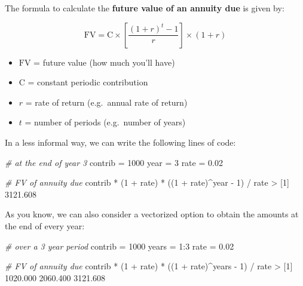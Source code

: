 \documentclass[
]{book}
\newenvironment{Shaded}{\begin{snugshade}}{\end{snugshade}}
\newcommand{\CommentTok}[1]{\textcolor[rgb]{0.56,0.35,0.01}{\textit{#1}}}
\newcommand{\DecValTok}[1]{\textcolor[rgb]{0.00,0.00,0.81}{#1}}
\newcommand{\FloatTok}[1]{\textcolor[rgb]{0.00,0.00,0.81}{#1}}
\newcommand{\NormalTok}[1]{#1}
\newcommand{\OtherTok}[1]{\textcolor[rgb]{0.56,0.35,0.01}{#1}}
\newcommand{\SpecialCharTok}[1]{\textcolor[rgb]{0.00,0.00,0.00}{#1}}
\begin{document}
The formula to calculate the \textbf{future value of an annuity due} is given by:

\[
\text{FV} = \text{C} \times \left [ \frac{(1 + r)^t - 1}{r} \right] \times (1 + r)
\]

\begin{itemize}
\item
  \(\text{FV}\) = future value (how much you'll have)
\item
  \(\text{C}\) = constant periodic contribution
\item
  \(r\) = rate of return (e.g.~annual rate of return)
\item
  \(t\) = number of periods (e.g.~number of years)
\end{itemize}

In a less informal way, we can write the following lines of code:

\begin{Shaded}
\begin{Highlighting}[]
\CommentTok{\# at the end of year 3}
\NormalTok{contrib }\OtherTok{=} \DecValTok{1000}
\NormalTok{year }\OtherTok{=} \DecValTok{3}
\NormalTok{rate }\OtherTok{=} \FloatTok{0.02}

\CommentTok{\# FV of annuity due}
\NormalTok{contrib }\SpecialCharTok{*}\NormalTok{ (}\DecValTok{1} \SpecialCharTok{+}\NormalTok{ rate) }\SpecialCharTok{*}\NormalTok{ ((}\DecValTok{1} \SpecialCharTok{+}\NormalTok{ rate)}\SpecialCharTok{\^{}}\NormalTok{year }\SpecialCharTok{{-}} \DecValTok{1}\NormalTok{) }\SpecialCharTok{/}\NormalTok{ rate}
\SpecialCharTok{\textgreater{}}\NormalTok{ [}\DecValTok{1}\NormalTok{] }\FloatTok{3121.608}
\end{Highlighting}
\end{Shaded}

As you know, we can also consider a vectorized option to obtain the
amounts at the end of every year:

\begin{Shaded}
\begin{Highlighting}[]
\CommentTok{\# over a 3 year period}
\NormalTok{contrib }\OtherTok{=} \DecValTok{1000}
\NormalTok{years }\OtherTok{=} \DecValTok{1}\SpecialCharTok{:}\DecValTok{3}
\NormalTok{rate }\OtherTok{=} \FloatTok{0.02}

\CommentTok{\# FV of annuity due}
\NormalTok{contrib }\SpecialCharTok{*}\NormalTok{ (}\DecValTok{1} \SpecialCharTok{+}\NormalTok{ rate) }\SpecialCharTok{*}\NormalTok{ ((}\DecValTok{1} \SpecialCharTok{+}\NormalTok{ rate)}\SpecialCharTok{\^{}}\NormalTok{years }\SpecialCharTok{{-}} \DecValTok{1}\NormalTok{) }\SpecialCharTok{/}\NormalTok{ rate}
\SpecialCharTok{\textgreater{}}\NormalTok{ [}\DecValTok{1}\NormalTok{] }\FloatTok{1020.000} \FloatTok{2060.400} \FloatTok{3121.608}
\end{Highlighting}
\end{Shaded}
\end{document}

